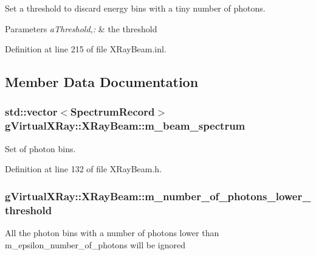 Set a threshold to discard energy bins with a tiny number of photons. 


\begin{DoxyParams}{Parameters}
{\em aThreshold,:} & the threshold \\
\hline
\end{DoxyParams}


Definition at line 215 of file XRayBeam.inl.



\subsection{Member Data Documentation}
\hypertarget{classg_virtual_x_ray_1_1_x_ray_beam_a15eeb7ae26c0d69c67d495055b6894ee}{
\subsubsection[{m\_\-beam\_\-spectrum}]{\setlength{\rightskip}{0pt plus 5cm}std::vector$<${\bf SpectrumRecord}$>$ {\bf gVirtualXRay::XRayBeam::m\_\-beam\_\-spectrum}}}
\label{classg_virtual_x_ray_1_1_x_ray_beam_a15eeb7ae26c0d69c67d495055b6894ee}


Set of photon bins. 



Definition at line 132 of file XRayBeam.h.

\hypertarget{classg_virtual_x_ray_1_1_x_ray_beam_a700a497bc1f73a3b2e2fc2c3e83bde61}{
\subsubsection[{m\_\-number\_\-of\_\-photons\_\-lower\_\-threshold}]{ {\bf gVirtualXRay::XRayBeam::m\_\-number\_\-of\_\-photons\_\-lower\_\-threshold}}}
\label{classg_virtual_x_ray_1_1_x_ray_beam_a700a497bc1f73a3b2e2fc2c3e83bde61}
All the photon bins with a number of photons lower than m\_\-epsilon\_\-number\_\-of\_\-photons will be ignored 

